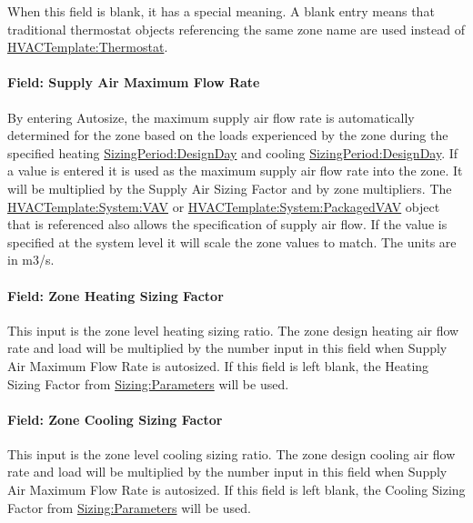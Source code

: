When this field is blank, it has a special meaning. A blank entry means that traditional thermostat objects referencing the same zone name are used instead of \hyperref[hvactemplatethermostat]{HVACTemplate:Thermostat}.

\paragraph{Field: Supply Air Maximum Flow Rate}\label{field-supply-air-maximum-flow-rate-3}

By entering Autosize, the maximum supply air flow rate is automatically determined for the zone based on the loads experienced by the zone during the specified heating \hyperref[sizingperioddesignday]{SizingPeriod:DesignDay} and cooling \hyperref[sizingperioddesignday]{SizingPeriod:DesignDay}. If a value is entered it is used as the maximum supply air flow rate into the zone. It will be multiplied by the Supply Air Sizing Factor and by zone multipliers. The \hyperref[hvactemplatesystemvav]{HVACTemplate:System:VAV} or \hyperref[hvactemplatesystempackagedvav]{HVACTemplate:System:PackagedVAV} object that is referenced also allows the specification of supply air flow. If the value is specified at the system level it will scale the zone values to match. The units are in m3/s.

\paragraph{Field: Zone Heating Sizing Factor}\label{field-zone-heating-sizing-factor-9}

This input is the zone level heating sizing ratio. The zone design heating air flow rate and load will be multiplied by the number input in this field when Supply Air Maximum Flow Rate is autosized. If this field is left blank, the Heating Sizing Factor from \hyperref[sizingparameters]{Sizing:Parameters} will be used.

\paragraph{Field: Zone Cooling Sizing Factor}\label{field-zone-cooling-sizing-factor-8}

This input is the zone level cooling sizing ratio. The zone design cooling air flow rate and load will be multiplied by the number input in this field when Supply Air Maximum Flow Rate is autosized. If this field is left blank, the Cooling Sizing Factor from \hyperref[sizingparameters]{Sizing:Parameters} will be used.

